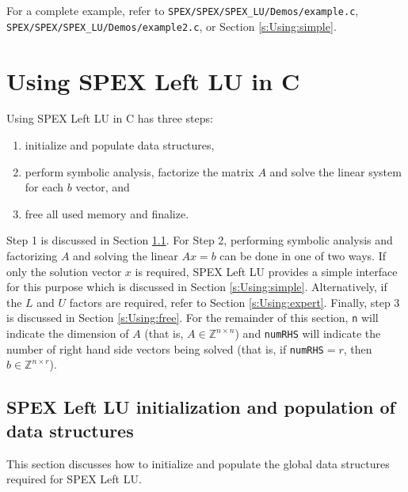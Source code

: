 \documentclass[12pt]{report}
\theoremstyle{definition}
\begin{document}
For a complete example, refer to \verb|SPEX/SPEX/SPEX_LU/Demos/example.c|,  \\
\verb|SPEX/SPEX/SPEX_LU/Demos/example2.c|, or Section \ref{s:Using:simple}.

\cprotect\section{Using SPEX Left LU in C} \label{s:Using}

Using SPEX Left LU in C has three steps:

\begin{enumerate}
\item initialize and populate data structures,
\item perform symbolic analysis,
factorize the matrix $A$ and solve the linear
system for each $b$ vector, and
\item free all used memory and finalize.
\end{enumerate}

Step 1 is discussed in Section \ref{s:Using:init}.  For Step 2, performing
symbolic analysis and factorizing $A$ and solving the linear $A x =b$ can be
done in one of two ways. If only the solution vector $x$ is required, SPEX Left LU
provides a simple interface for this purpose which is discussed in Section
\ref{s:Using:simple}.  Alternatively, if the $L$ and $U$ factors are required,
refer to Section \ref{s:Using:expert}.  Finally, step 3 is discussed in Section
\ref{s:Using:free}. For the remainder of this section, \verb|n| will indicate
the dimension of $A$ (that is, $A \in \mathbb{Z}^{n \times n}$) and
\verb|numRHS| will indicate the number of right hand side vectors being solved
(that is, if \verb|numRHS|$= r$, then $b \in \mathbb{Z}^{n \times r}$).

\cprotect\subsection{SPEX Left LU initialization and population of data structures}
\label{s:Using:init}

This section discusses how to initialize and populate the global data
structures required for SPEX Left LU.
\end{document}
